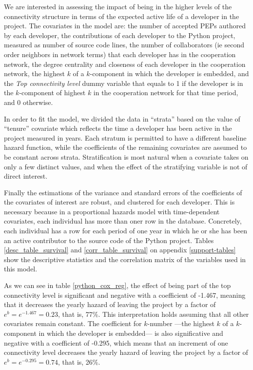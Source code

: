 We are interested in assessing the impact of being in the higher levels of the connectivity structure in terms of the expected active life of a developer in the project. The covariates in the model are: the number of accepted PEPs authored by each developer, the contributions of each developer to the Python project, measured as number of source code lines, the number of collaborators (ie second order neighbors in network terms) that each developer has in the cooperation network, the degree centrality and closeness of each developer in the cooperation network, the highest $k$ of a $k$-component in which the developer is embedded, and the \emph{Top connectivity level} dummy variable that equals to 1 if the developer is in the $k$-component of highest $k$ in the cooperation network for that time period, and 0 otherwise.



In order to fit the model, we divided the data in ``strata'' based on the value of ``tenure'' covariate which reflects the time a developer has been active in the project measured in years. Each stratum is permitted to have a different baseline hazard function, while the coefficients of the remaining covariates are assumed to be constant across strata. Stratification is most natural when a covariate takes on only a few distinct values, and when the effect of the stratifying variable is not of direct interest.

Finally the estimations of the variance and standard errors of the coefficients of the covariates of interest are robust, and clustered for each developer. This is necessary because in a proportional hazards model with time-dependent covariates, each individual has more than oner row in the database. Concretely, each individual has a row for each period of one year in which he or she has been an active contributor to the source code of the Python project. Tables \ref{desc_table_survival} and \ref{corr_table_survival} on appendix \ref{support-tables} show the descriptive statistics and the correlation matrix of the variables used in this model.

As we can see in table \ref{python_cox_reg}, the effect of being part of the top connectivity level is significant and negative with a coefficient of -1.467, meaning that it decreases the yearly hazard of leaving the project by a factor of $e^b = e^{-1.467} = 0.23$, that is, 77\%. This interpretation holds assuming that all other covariates remain constant. The coefficient for $k$-number ---the highest $k$ of a $k$-component in which the developer is embedded--- is also significative and negative with a coefficient of -0.295, which means that an increment of one connectivity level decreases the yearly hazard of leaving the project by a factor of $e^b = e^{-0.295} = 0.74$, that is, 26\%.

